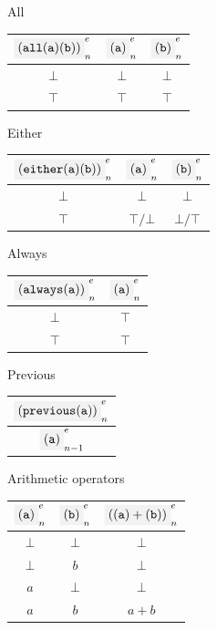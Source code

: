 All

\begin{center}
\begin{tabular}{c|cc}
  $\codemath{(all(a)(b))}_n^e$ & $\codemath{(a)}_n^e$ & $\codemath{(b)}_n^e$ \\
  \hline
  $\bot$&$\bot$ &$\bot$ \\
  $\top$& $\top$&$\top$ \\
\end{tabular}
\end{center}


Either

\begin{center}
\begin{tabular}{c|cc}
  $\codemath{(either(a)(b))}_n^e$ & $\codemath{(a)}_n^e$ & $\codemath{(b)}_n^e$ \\
  \hline
  $\bot$& $\bot$ &$\bot$ \\
  $\top$& $\top / \bot$& $\bot / \top$ \\
\end{tabular}
\end{center}

Always

\begin{center}
\begin{tabular}{c|c}
  $\codemath{(always(a))}_n^e$ & $\codemath{(a)}_n^e$ \\
  \hline
  $\bot$& $\top$  \\
  $\top$& $\top$ \\
\end{tabular}
\end{center}

Previous

\begin{center}
\begin{tabular}{|c}
    $\codemath{(previous(a))}_n^e$ \\
  \hline
  $\codemath{(a)}_{n-1}^e$
\end{tabular}
\end{center}

Arithmetic operators

\begin{center}
\begin{tabular}{cc|c}
  $\codemath{(a)}_n^e$ & $\codemath{(b)}_n^e$ & $\codemath{((a)+(b))}_n^e$ \\
  \hline
  $\bot$& $\bot$ & $\bot$ \\
  $\bot$& $b$ & $\bot$ \\
   $a$& $\bot$ & $\bot$ \\
   $a$& $b$ & $a+b$ 
\end{tabular}
\end{center}


